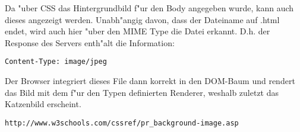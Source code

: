 \documentclass[11pt, oneside, BCOR0mm, DIV9, headinclude]{scrartcl}
\begin{document}
\begin{enumerate}
		Da "uber CSS das Hintergrundbild f"ur den Body angegeben wurde, kann auch dieses angezeigt
		werden. Unabh"angig davon, dass der Dateiname auf .html endet, wird auch hier "uber den MIME
		Type die Datei erkannt. D.h. der Response des Servers enth"alt die Information:
		\begin{verbatim}Content-Type: image/jpeg\end{verbatim} Der Browser integriert dieses File dann
		korrekt in den DOM-Baum und rendert das Bild mit dem f"ur den Typen definierten Renderer, weshalb 
		zuletzt das Katzenbild erscheint.
		\begin{verbatim}http://www.w3schools.com/cssref/pr_background-image.asp\end{verbatim}

\end{enumerate}
\end{document}
